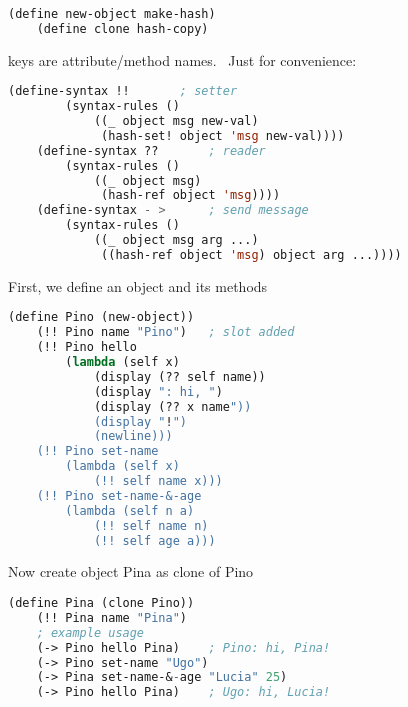 \begin{lstlisting}[language=Lisp]
    (define new-object make-hash)
    (define clone hash-copy)
\end{lstlisting}
keys are attribute/method names. \
Just for convenience:
\begin{lstlisting}[language=Lisp]
    (define-syntax !!       ; setter
        (syntax-rules ()
            ((_ object msg new-val)
             (hash-set! object 'msg new-val))))
    (define-syntax ??       ; reader
        (syntax-rules ()
            ((_ object msg)
             (hash-ref object 'msg))))
    (define-syntax - >      ; send message
        (syntax-rules ()
            ((_ object msg arg ...)
             ((hash-ref object 'msg) object arg ...))))
\end{lstlisting}
First, we define an object and its methods
\begin{lstlisting}[language=Lisp]
    (define Pino (new-object))
    (!! Pino name "Pino")   ; slot added
    (!! Pino hello 
        (lambda (self x)
            (display (?? self name))
            (display ": hi, ")
            (display (?? x name"))
            (display "!")
            (newline)))
    (!! Pino set-name
        (lambda (self x)
            (!! self name x)))
    (!! Pino set-name-&-age
        (lambda (self n a)
            (!! self name n)
            (!! self age a)))
\end{lstlisting}
Now create object Pina as clone of Pino
\begin{lstlisting}[language=Lisp]
    (define Pina (clone Pino))
    (!! Pina name "Pina")
    ; example usage
    (-> Pino hello Pina)    ; Pino: hi, Pina!
    (-> Pino set-name "Ugo")
    (-> Pina set-name-&-age "Lucia" 25)
    (-> Pino hello Pina)    ; Ugo: hi, Lucia!
\end{lstlisting}


